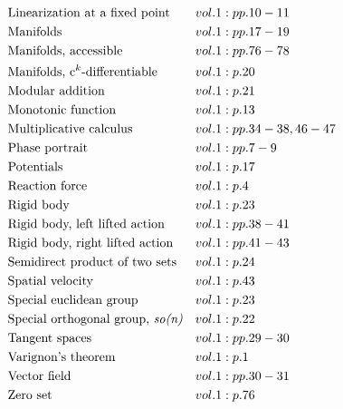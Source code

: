 \documentclass[a4paper]{article}
\begin{document}
\begin{align*}
&\text{Linearization at a fixed point} && vol. 1: pp. 10-11\\
&\text{Manifolds} && vol. 1: pp. 17-19\\
&\text{Manifolds, accessible} && vol. 1: pp. 76-78\\
&\text{Manifolds, c$^k$-differentiable} && vol. 1: p. 20\\
&\text{Modular addition} && vol. 1: p. 21\\
&\text{Monotonic function} && vol. 1: p. 13\\
&\text{Multiplicative calculus} && vol. 1: pp. 34-38, 46-47\\
&\text{Phase portrait} && vol. 1: pp. 7-9\\
&\text{Potentials} && vol. 1: p. 17\\
&\text{Reaction force} && vol. 1: p. 4\\
&\text{Rigid body} && vol. 1: p. 23\\
&\text{Rigid body, left lifted action} && vol. 1: pp. 38-41\\
&\text{Rigid body, right lifted action} && vol. 1: pp. 41-43\\
&\text{Semidirect product of two sets} && vol. 1: p. 24\\
&\text{Spatial velocity} && vol. 1: p. 43\\
&\text{Special euclidean group} && vol. 1: p. 23\\
&\text{Special orthogonal group, \emph{so(n)}} && vol. 1: p. 22\\
&\text{Tangent spaces} && vol. 1: pp. 29-30\\
&\text{Varignon's theorem} && vol. 1: p. 1\\
&\text{Vector field} && vol. 1: pp. 30-31\\
&\text{Zero set} && vol. 1: p. 76\\
\end{align*} 
\end{document}

